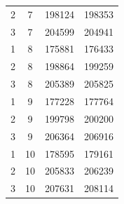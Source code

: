 \documentclass[12pt, a4paper]{report}
\begin{document}
\begin{table} [H]
\begin{tabular}[l]{|c c c c|}
			2 & 7 & 198124 & 198353  \\ 
			
			3 & 7 & 204599 & 204941  \\\hline
			
			1 & 8 & 175881 & 176433  \\ 
			
			2 & 8 & 198864 & 199259  \\ 
			
			3 & 8 & 205389 & 205825  \\\hline
			
			1 & 9 & 177228 & 177764  \\ 
			
			2 & 9 & 199798 & 200200  \\ 
			
			3 & 9 & 206364 & 206916  \\\hline
			
			1 & 10 & 178595 & 179161  \\ 
			
			2 & 10 & 205833 & 206239  \\ 
			
			3 & 10 & 207631 & 208114  \\\hline
		\end{tabular}
	\end{table}
	
\end{document}
